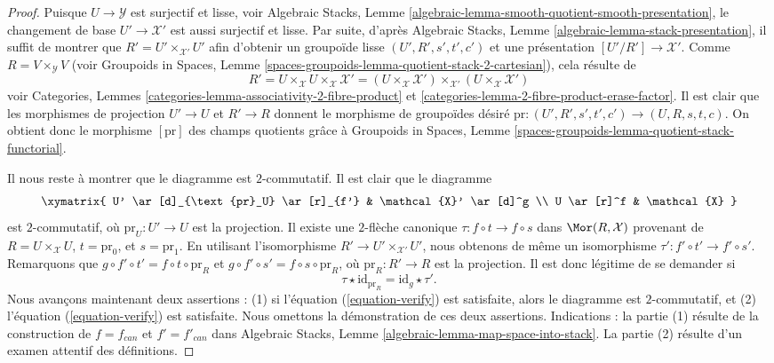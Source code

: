 \begin{proof}
Puisque $U \to \mathcal{Y}$ est surjectif et lisse, voir
Algebraic Stacks,
Lemme \ref{algebraic-lemma-smooth-quotient-smooth-presentation},
le changement de base $U' \to \mathcal{X}'$ est aussi surjectif et lisse.
Par suite, d'après
Algebraic Stacks,
Lemme \ref{algebraic-lemma-stack-presentation},
il suffit de montrer que $R' = U' \times_{\mathcal{X}'} U'$ afin
d'obtenir un groupoïde lisse $(U', R', s', t', c')$ et une présentation
$[U'/R'] \to \mathcal{X}'$.
Comme $R = V \times_\mathcal{Y} V$ (voir
Groupoids in Spaces,
Lemme \ref{spaces-groupoids-lemma-quotient-stack-2-cartesian}),
cela résulte de
$$
R' =
U \times_\mathcal{X} U \times_\mathcal{X} \mathcal{X}' =
(U \times_\mathcal{X} \mathcal{X}')
\times_{\mathcal{X}'}
(U \times_\mathcal{X} \mathcal{X}')
$$
voir
Categories, Lemmes \ref{categories-lemma-associativity-2-fibre-product} et
\ref{categories-lemma-2-fibre-product-erase-factor}.
Il est clair que les morphismes de projection $U' \to U$ et $R' \to R$ donnent le
morphisme de groupoïdes désiré
$\text{pr} : (U', R', s', t', c') \to (U, R, s, t, c)$.
On obtient donc le morphisme $[\text{pr}]$ des champs quotients grâce à
Groupoids in Spaces,
Lemme \ref{spaces-groupoids-lemma-quotient-stack-functorial}.

\medskip\noindent
Il nous reste à montrer que le diagramme est $2$-commutatif.
Il est clair que le diagramme
$$
\xymatrix{
U' \ar[d]_{\text{pr}_U} \ar[r]_{f'} & \mathcal{X}' \ar[d]^g \\
U \ar[r]^f & \mathcal{X}
}
$$
est $2$-commutatif, où $\text{pr}_U : U' \to U$ est la projection.
Il existe une $2$-flèche canonique
$\tau : f \circ t \to f \circ s$ dans $\Mor(R, \mathcal{X})$
provenant de $R = U \times_\mathcal{X} U$, $t = \text{pr}_0$, et
$s = \text{pr}_1$. En utilisant l'isomorphisme
$R' \to U' \times_{\mathcal{X}'} U'$, nous obtenons de même un isomorphisme
$\tau' : f' \circ t' \to f' \circ s'$. Remarquons que
$g \circ f' \circ t' = f \circ t \circ \text{pr}_R$ et
$g \circ f' \circ s' = f \circ s \circ \text{pr}_R$, où
$\text{pr}_R : R' \to R$ est la projection. Il est donc légitime de se demander
si
\begin{equation}
\label{equation-verify}
\tau \star \text{id}_{\text{pr}_R} = \text{id}_g \star \tau'.
\end{equation}
Nous avançons maintenant deux assertions : (1) si l'équation (\ref{equation-verify}) est satisfaite,
alors le diagramme est $2$-commutatif, et (2) l'équation (\ref{equation-verify}) est satisfaite.
Nous omettons la démonstration de ces deux assertions. Indications : la partie (1) résulte de la
construction de $f = f_{can}$ et $f' = f'_{can}$ dans
Algebraic Stacks, Lemme \ref{algebraic-lemma-map-space-into-stack}.
La partie (2) résulte d'un examen attentif des définitions.
\end{proof}

